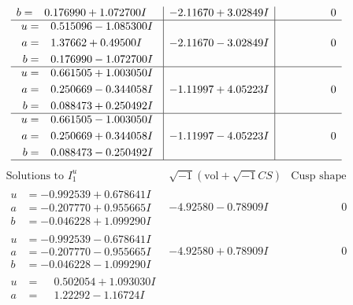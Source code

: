 \documentclass[1p]{elsarticle_modified}
\theoremstyle{definition}
\newcommand{\I}{\sqrt{-1}}
\begin{document}
$$\begin{array}{c|c|c}
\begin{aligned}
b &= \phantom{-}0.176990 + 1.072700 I\end{aligned}
 & -2.11670 + 3.02849 I & \phantom{-0.000000 } 0 \\ \hline\begin{aligned}
u &= \phantom{-}0.515096 - 1.085300 I \\
a &= \phantom{-}1.37662 + 0.49500 I \\
b &= \phantom{-}0.176990 - 1.072700 I\end{aligned}
 & -2.11670 - 3.02849 I & \phantom{-0.000000 } 0 \\ \hline\begin{aligned}
u &= \phantom{-}0.661505 + 1.003050 I \\
a &= \phantom{-}0.250669 - 0.344058 I \\
b &= \phantom{-}0.088473 + 0.250492 I\end{aligned}
 & -1.11997 + 4.05223 I & \phantom{-0.000000 } 0 \\ \hline\begin{aligned}
u &= \phantom{-}0.661505 - 1.003050 I \\
a &= \phantom{-}0.250669 + 0.344058 I \\
b &= \phantom{-}0.088473 - 0.250492 I\end{aligned}
 & -1.11997 - 4.05223 I & \phantom{-0.000000 } 0\\
 \hline 
 \end{array}$$\newpage$$\begin{array}{c|c|c}  
\text{Solutions to }I^u_{1}& \I (\text{vol} + \sqrt{-1}CS) & \text{Cusp shape}\\
 \hline 
\begin{aligned}
u &= -0.992539 + 0.678641 I \\
a &= -0.207770 + 0.955665 I \\
b &= -0.046228 + 1.099290 I\end{aligned}
 & -4.92580 - 0.78909 I & \phantom{-0.000000 } 0 \\ \hline\begin{aligned}
u &= -0.992539 - 0.678641 I \\
a &= -0.207770 - 0.955665 I \\
b &= -0.046228 - 1.099290 I\end{aligned}
 & -4.92580 + 0.78909 I & \phantom{-0.000000 } 0 \\ \hline\begin{aligned}
u &= \phantom{-}0.502054 + 1.093030 I \\
a &= \phantom{-}1.22292 - 1.16724 I \\

\end{aligned}
\end{array}$$
\end{document}
